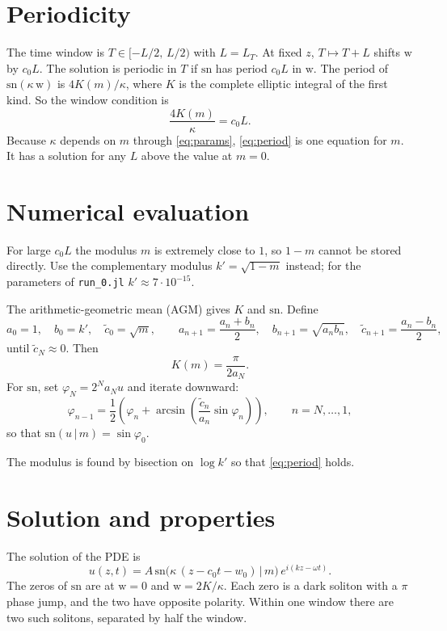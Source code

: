 \documentclass{article}
\begin{document}
\section{Periodicity}
The time window is $T\in[-L/2,\,L/2)$ with $L = L_T$. At fixed $z$, $T\mapsto T+L$ shifts $\mathrm{w}$ by $c_0L$. The solution is periodic in $T$ if $\mathrm{sn}$ has period $c_0 L$ in $\mathrm{w}$. The period of $\mathrm{sn}(\kappa\,\mathrm{w})$ is $4K(m)/\kappa$, where $K$ is the complete elliptic integral of the first kind. So the window condition is
\begin{equation}\label{eq:period}
    \frac{4K(m)}{\kappa} = c_0 L.
\end{equation}
Because $\kappa$ depends on $m$ through \eqref{eq:params}, \eqref{eq:period} is one equation for $m$. It has a solution for any $L$ above the value at $m=0$.

\section{Numerical evaluation}
For large $c_0L$ the modulus $m$ is extremely close to $1$, so $1-m$ cannot be stored directly. Use the complementary modulus $k'=\sqrt{1-m}$ instead; for the parameters of \texttt{run\_0.jl} $k'\approx 7\cdot 10^{-15}$.

The arithmetic-geometric mean (AGM) gives $K$ and $\mathrm{sn}$. Define
\begin{equation}\label{eq:agm}
    a_0 = 1,\quad b_0 = k',\quad \tilde c_0 = \sqrt{m},
    \qquad
    a_{n+1} = \frac{a_n+b_n}{2},\quad
    b_{n+1} = \sqrt{a_n b_n},\quad
    \tilde c_{n+1} = \frac{a_n-b_n}{2},
\end{equation}
until $\tilde c_N\approx 0$. Then
\begin{equation}\label{eq:K}
    K(m) = \frac{\pi}{2a_N}.
\end{equation}
For $\mathrm{sn}$, set $\varphi_N = 2^N a_N u$ and iterate downward:
\begin{equation}\label{eq:phi}
    \varphi_{n-1} = \frac{1}{2}\left(\varphi_n + \arcsin\!\left(\frac{\tilde c_n}{a_n}\sin\varphi_n\right)\right),
    \qquad n = N,\dots,1,
\end{equation}
so that $\mathrm{sn}(u\,|\,m) = \sin\varphi_0$.

The modulus is found by bisection on $\log k'$ so that \eqref{eq:period} holds.

\section{Solution and properties}
The solution of the PDE is
\begin{equation}\label{eq:solution}
    u(z,t) = A\,\mathrm{sn}\bigl(\kappa\,(z-c_0 t-w_0)\,\big|\,m\bigr)\,e^{i(kz-\omega t)}.
\end{equation}
The zeros of $\mathrm{sn}$ are at $\mathrm{w}=0$ and $\mathrm{w}=2K/\kappa$. Each zero is a dark soliton with a $\pi$ phase jump, and the two have opposite polarity. Within one window there are two such solitons, separated by half the window.
\end{document}
